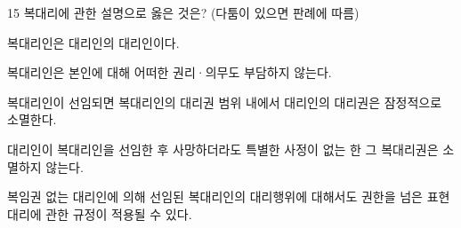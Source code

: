 \begin{question}{15}
복대리에 관한 설명으로 옳은 것은? (다툼이 있으면 판례에 따름)
\begin{choices}
  \item 복대리인은 대리인의 대리인이다.
  \item 복대리인은 본인에 대해 어떠한 권리·의무도 부담하지 않는다.
  \item 복대리인이 선임되면 복대리인의 대리권 범위 내에서 대리인의 대리권은 잠정적으로 소멸한다.
  \item 대리인이 복대리인을 선임한 후 사망하더라도 특별한 사정이 없는 한 그 복대리권은 소멸하지 않는다.
  \item 복임권 없는 대리인에 의해 선임된 복대리인의 대리행위에 대해서도 권한을 넘은 표현대리에 관한 규정이 적용될 수 있다.
\end{choices}
\end{question}

